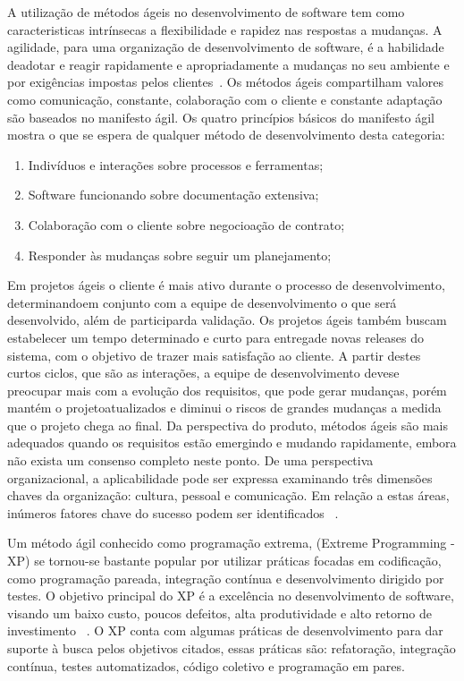 A utilização de métodos ágeis no desenvolvimento de software tem como caracteristicas 
intrínsecas a flexibilidade e rapidez nas respostas a mudanças. 
%
A agilidade, para uma organização de desenvolvimento de software, é a habilidade 
deadotar e reagir rapidamente e apropriadamente a mudanças no seu ambiente e por 
exigências impostas pelos clientes~\cite{nerur2005}.
%
Os métodos ágeis compartilham valores como comunicação,  constante, colaboração 
com o cliente e constante adaptação são baseados no manifesto ágil. Os quatro princípios 
básicos do manifesto ágil mostra o que se espera de qualquer método de desenvolvimento 
desta categoria:
%
\begin{enumerate}
\item Indivíduos  e interações sobre processos e ferramentas;
\item Software funcionando sobre documentação extensiva;
\item Colaboração com o cliente sobre negocioação de contrato;
\item Responder às  mudanças sobre seguir um planejamento;
\end{enumerate}
%
Em projetos ágeis o cliente é mais ativo durante o processo de desenvolvimento, 
determinandoem conjunto com a equipe de desenvolvimento o que será desenvolvido, 
além de participarda validação. Os projetos ágeis também buscam estabelecer um 
tempo determinado e curto para entregade novas releases do sistema, com o objetivo 
de trazer mais satisfação ao cliente.
%
A partir destes curtos ciclos, que são as interações, a equipe de desenvolvimento 
devese preocupar mais com a evolução dos requisitos, que pode gerar mudanças, porém 
mantém o projetoatualizados e diminui o riscos de grandes mudanças a medida que o 
projeto chega ao final.
%
Da perspectiva do produto, métodos ágeis são mais adequados quando os requisitos 
estão emergindo e mudando rapidamente, embora não exista um consenso completo 
neste ponto. De uma perspectiva organizacional, a aplicabilidade pode ser expressa 
examinando três dimensões chaves da organização: cultura, pessoal e comunicação. 
Em relação a estas áreas, inúmeros fatores chave do sucesso podem ser identificados 
~\cite{cohen2004}.

Um método ágil conhecido como programação extrema, (Extreme Programming - XP) se 
tornou-se bastante popular por utilizar práticas focadas em codificação, como 
programação pareada, integração contínua e desenvolvimento dirigido por testes.
%
O objetivo principal do XP é a excelência no desenvolvimento de software, visando 
um baixo custo, poucos defeitos, alta produtividade e alto retorno de investimento
~\cite{sato2007}.
O XP conta com algumas práticas de desenvolvimento para dar suporte à busca pelos 
objetivos citados, essas práticas são: refatoração, integração contínua, testes 
automatizados, código coletivo e programação em pares.

